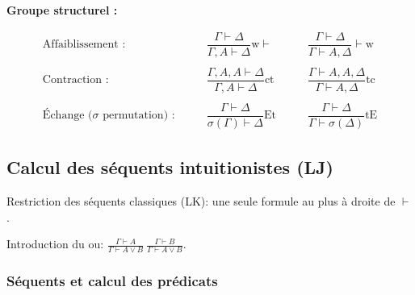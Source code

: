 \documentclass[french]{article}
\begin{document}
\textbf{Groupe structurel :}

\begin{align*}
\text{Affaiblissement :} &\qquad \dfrac{\Gamma\vdash\Delta}{\Gamma, A\vdash\Delta}\text{w}\vdash &\qquad
\dfrac{\Gamma\vdash\Delta}{\Gamma\vdash A,\Delta}\vdash\text{w}\\
\\
\text{Contraction :} &\qquad\dfrac{\Gamma, A, A\vdash\Delta}{\Gamma, A\vdash\Delta}\text{ct} &\qquad
\dfrac{\Gamma\vdash A, A,\Delta}{\Gamma\vdash A,\Delta}\text{tc}\\
\\
\text{Échange ($\sigma$ permutation) :}&\qquad\dfrac{\Gamma\vdash\Delta}{\sigma (\Gamma)\vdash\Delta}\text{Et} &\qquad
\dfrac{\Gamma\vdash\Delta}{\Gamma\vdash\sigma (\Delta)}\text{tE}
\end{align*}


\subsection{Calcul des séquents intuitionistes (LJ)}
Restriction des séquents classiques (LK): une seule formule au plus à droite de $\vdash$.

Introduction du ou:
$\frac{\Gamma\vdash A}{\Gamma\vdash A\vee B}\ \frac{\Gamma\vdash B}{\Gamma\vdash A\vee B}$.


\subsubsection{Séquents et calcul des prédicats}

\end{document}
